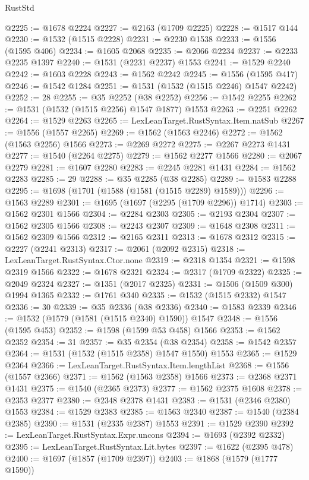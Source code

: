 \begin{lexlean}{RustStd}
\begin{coremodule}
@2225 := @1678 @2224
@2227 := @2163 (@1709 @2225)
@2228 := @1517 @144
@2230 := @1532 (@1515 @2228)
@2231 := @2230 @1538
@2233 := @1556 (@1595 @406)
@2234 := @1605 @2068
@2235 := @2066 @2234
@2237 := @2233 @2235 @1397
@2240 := @1531 (@2231 @2237) @1553
@2241 := @1529 @2240
@2242 := @1603 @2228
@2243 := @1562 @2242
@2245 := @1556 (@1595 @417)
@2246 := @1542 @1284
@2251 := @1531 (@1532 (@1515 @2246) @1547 @2242)
@2252 := 28
@2255 := @35 @2252 (@38 @2252)
@2256 := @1542 @2255
@2262 := @1531 (@1532 (@1515 @2256) @1547 @1877) @1553
@2263 := @2251 @2262
@2264 := @1529 @2263
@2265 := LexLeanTarget.RustSyntax.Item.natSub
@2267 := @1556 (@1557 @2265)
@2269 := @1562 (@1563 @2246)
@2272 := @1562 (@1563 @2256) @1566
@2273 := @2269 @2272
@2275 := @2267 @2273 @1431
@2277 := @1540 (@2264 @2275)
@2279 := @1562 @2277 @1566
@2280 := @2067 @2279
@2281 := @1607 @2280
@2283 := @2245 @2281 @1431
@2284 := @1562 @2283
@2285 := 29
@2288 := @35 @2285 (@38 @2285)
@2289 := @1583 @2288
@2295 := @1698 (@1701 (@1588 (@1581 (@1515 @2289) @1589)))
@2296 := @1563 @2289
@2301 := @1695 (@1697 (@2295 (@1709 @2296)) @1714)
@2303 := @1562 @2301 @1566
@2304 := @2284 @2303
@2305 := @2193 @2304
@2307 := @1562 @2305 @1566
@2308 := @2243 @2307
@2309 := @1648 @2308
@2311 := @1562 @2309 @1566
@2312 := @2165 @2311
@2313 := @1678 @2312
@2315 := @2227 (@2241 @2313)
@2317 := @2061 (@2092 @2315)
@2318 := LexLeanTarget.RustSyntax.Ctor.none
@2319 := @2318 @1354
@2321 := @1598 @2319 @1566
@2322 := @1678 @2321
@2324 := @2317 (@1709 @2322)
@2325 := @2049 @2324
@2327 := @1351 (@2017 @2325)
@2331 := @1506 (@1509 @300) @1994 @1365
@2332 := @1761 @340
@2335 := @1532 (@1515 @2332) @1547
@2336 := 30
@2339 := @35 @2336 (@38 @2336)
@2340 := @1583 @2339
@2346 := @1532 (@1579 (@1581 (@1515 @2340) @1590)) @1547
@2348 := @1556 (@1595 @453)
@2352 := @1598 (@1599 @53 @458) @1566
@2353 := @1562 @2352
@2354 := 31
@2357 := @35 @2354 (@38 @2354)
@2358 := @1542 @2357
@2364 := @1531 (@1532 (@1515 @2358) @1547 @1550) @1553
@2365 := @1529 @2364
@2366 := LexLeanTarget.RustSyntax.Item.lengthList
@2368 := @1556 (@1557 @2366)
@2371 := @1562 (@1563 @2358) @1566
@2373 := @2368 @2371 @1431
@2375 := @1540 (@2365 @2373)
@2377 := @1562 @2375 @1608
@2378 := @2353 @2377
@2380 := @2348 @2378 @1431
@2383 := @1531 (@2346 @2380) @1553
@2384 := @1529 @2383
@2385 := @1563 @2340
@2387 := @1540 (@2384 @2385)
@2390 := @1531 (@2335 @2387) @1553
@2391 := @1529 @2390
@2392 := LexLeanTarget.RustSyntax.Expr.uncons
@2394 := @1693 (@2392 @2332)
@2395 := LexLeanTarget.RustSyntax.Lit.bytes
@2397 := @1622 (@2395 @478)
@2400 := @1697 (@1857 (@1709 @2397))
@2403 := @1868 (@1579 (@1777 @1590))

\end{coremodule}
\end{lexlean}
